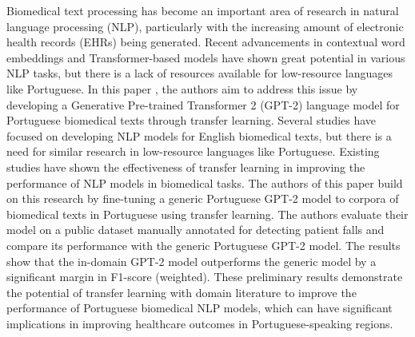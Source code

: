 \documentclass[12pt]{IEEEtran}
\begin{document}
Biomedical text processing has become an important area of research in natural language processing (NLP), particularly with the increasing amount of electronic health records (EHRs) being generated. Recent advancements in contextual word embeddings and Transformer-based models have shown great potential in various NLP tasks, but there is a lack of resources available for low-resource languages like Portuguese. In this paper \cite{por}, the authors aim to address this issue by developing a Generative Pre-trained Transformer 2 (GPT-2) language model for Portuguese biomedical texts through transfer learning. Several studies have focused on developing NLP models for English biomedical texts, but there is a need for similar research in low-resource languages like Portuguese. Existing studies have shown the effectiveness of transfer learning in improving the performance of NLP models in biomedical tasks. The authors of this paper build on this research by fine-tuning a generic Portuguese GPT-2 model to corpora of biomedical texts in Portuguese using transfer learning. The authors evaluate their model on a public dataset manually annotated for detecting patient falls and compare its performance with the generic Portuguese GPT-2 model. The results show that the in-domain GPT-2 model outperforms the generic model by a significant margin in F1-score (weighted). These preliminary results demonstrate the potential of transfer learning with domain literature to improve the performance of Portuguese biomedical NLP models, which can have significant implications in improving healthcare outcomes in Portuguese-speaking regions.
\end{document}
